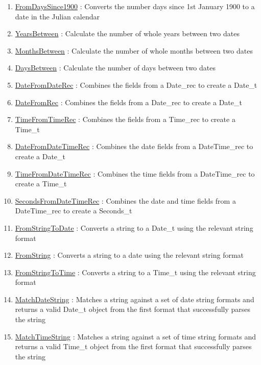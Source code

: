 \begin{enumerate}
\item \hyperlink{ecldoc:date.fromdayssince1900}{FromDaysSince1900}
: Converts the number days since 1st January 1900 to a date in the Julian calendar
\item \hyperlink{ecldoc:date.yearsbetween}{YearsBetween}
: Calculate the number of whole years between two dates
\item \hyperlink{ecldoc:date.monthsbetween}{MonthsBetween}
: Calculate the number of whole months between two dates
\item \hyperlink{ecldoc:date.daysbetween}{DaysBetween}
: Calculate the number of days between two dates
\item \hyperlink{ecldoc:date.datefromdaterec}{DateFromDateRec}
: Combines the fields from a Date\_rec to create a Date\_t
\item \hyperlink{ecldoc:date.datefromrec}{DateFromRec}
: Combines the fields from a Date\_rec to create a Date\_t
\item \hyperlink{ecldoc:date.timefromtimerec}{TimeFromTimeRec}
: Combines the fields from a Time\_rec to create a Time\_t
\item \hyperlink{ecldoc:date.datefromdatetimerec}{DateFromDateTimeRec}
: Combines the date fields from a DateTime\_rec to create a Date\_t
\item \hyperlink{ecldoc:date.timefromdatetimerec}{TimeFromDateTimeRec}
: Combines the time fields from a DateTime\_rec to create a Time\_t
\item \hyperlink{ecldoc:date.secondsfromdatetimerec}{SecondsFromDateTimeRec}
: Combines the date and time fields from a DateTime\_rec to create a Seconds\_t
\item \hyperlink{ecldoc:date.fromstringtodate}{FromStringToDate}
: Converts a string to a Date\_t using the relevant string format
\item \hyperlink{ecldoc:date.fromstring}{FromString}
: Converts a string to a date using the relevant string format
\item \hyperlink{ecldoc:date.fromstringtotime}{FromStringToTime}
: Converts a string to a Time\_t using the relevant string format
\item \hyperlink{ecldoc:date.matchdatestring}{MatchDateString}
: Matches a string against a set of date string formats and returns a valid Date\_t object from the first format that successfully parses the string
\item \hyperlink{ecldoc:date.matchtimestring}{MatchTimeString}
: Matches a string against a set of time string formats and returns a valid Time\_t object from the first format that successfully parses the string

\end{enumerate}
